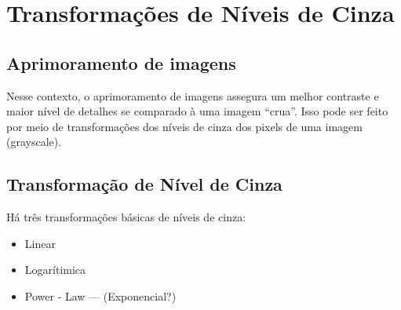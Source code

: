 \documentclass[a4paper, 12pt]{article}
\begin{document}
\section{Transformações de Níveis de Cinza}
\subsection{Aprimoramento de imagens}
Nesse contexto, o aprimoramento de imagens assegura um melhor contraste e maior nível de detalhes se comparado à uma imagem ``crua''. Isso pode ser 
feito por meio de transformações dos níveis de cinza dos pixels de uma imagem (grayscale).

\subsection{Transformação de Nível de Cinza}
Há três transformações básicas de níveis de cinza:
\begin{itemize}
	\item Linear 
 	\item Logarítimica 
  	\item Power - Law --- (Exponencial?)  
\end{itemize}
\end{document}
